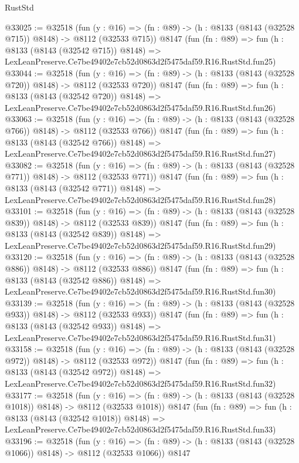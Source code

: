 \begin{lexlean}{RustStd}
\begin{coremodule}
@33025 := @32518
    (fun (y : @16) => (fn : @89) -> (h : @8133 (@8143 (@32528 @715)) @8148) -> @8112 (@32533 @715))
    @8147
    (fun (fn : @89) =>
    fun (h : @8133 (@8143 (@32542 @715)) @8148) =>
    LexLeanPreserve.Ce7be49402e7cb52d0863d2f5475daf59.R16.RustStd.fun25)
@33044 := @32518
    (fun (y : @16) => (fn : @89) -> (h : @8133 (@8143 (@32528 @720)) @8148) -> @8112 (@32533 @720))
    @8147
    (fun (fn : @89) =>
    fun (h : @8133 (@8143 (@32542 @720)) @8148) =>
    LexLeanPreserve.Ce7be49402e7cb52d0863d2f5475daf59.R16.RustStd.fun26)
@33063 := @32518
    (fun (y : @16) => (fn : @89) -> (h : @8133 (@8143 (@32528 @766)) @8148) -> @8112 (@32533 @766))
    @8147
    (fun (fn : @89) =>
    fun (h : @8133 (@8143 (@32542 @766)) @8148) =>
    LexLeanPreserve.Ce7be49402e7cb52d0863d2f5475daf59.R16.RustStd.fun27)
@33082 := @32518
    (fun (y : @16) => (fn : @89) -> (h : @8133 (@8143 (@32528 @771)) @8148) -> @8112 (@32533 @771))
    @8147
    (fun (fn : @89) =>
    fun (h : @8133 (@8143 (@32542 @771)) @8148) =>
    LexLeanPreserve.Ce7be49402e7cb52d0863d2f5475daf59.R16.RustStd.fun28)
@33101 := @32518
    (fun (y : @16) => (fn : @89) -> (h : @8133 (@8143 (@32528 @839)) @8148) -> @8112 (@32533 @839))
    @8147
    (fun (fn : @89) =>
    fun (h : @8133 (@8143 (@32542 @839)) @8148) =>
    LexLeanPreserve.Ce7be49402e7cb52d0863d2f5475daf59.R16.RustStd.fun29)
@33120 := @32518
    (fun (y : @16) => (fn : @89) -> (h : @8133 (@8143 (@32528 @886)) @8148) -> @8112 (@32533 @886))
    @8147
    (fun (fn : @89) =>
    fun (h : @8133 (@8143 (@32542 @886)) @8148) =>
    LexLeanPreserve.Ce7be49402e7cb52d0863d2f5475daf59.R16.RustStd.fun30)
@33139 := @32518
    (fun (y : @16) => (fn : @89) -> (h : @8133 (@8143 (@32528 @933)) @8148) -> @8112 (@32533 @933))
    @8147
    (fun (fn : @89) =>
    fun (h : @8133 (@8143 (@32542 @933)) @8148) =>
    LexLeanPreserve.Ce7be49402e7cb52d0863d2f5475daf59.R16.RustStd.fun31)
@33158 := @32518
    (fun (y : @16) => (fn : @89) -> (h : @8133 (@8143 (@32528 @972)) @8148) -> @8112 (@32533 @972))
    @8147
    (fun (fn : @89) =>
    fun (h : @8133 (@8143 (@32542 @972)) @8148) =>
    LexLeanPreserve.Ce7be49402e7cb52d0863d2f5475daf59.R16.RustStd.fun32)
@33177 := @32518
    (fun (y : @16) =>
    (fn : @89) -> (h : @8133 (@8143 (@32528 @1018)) @8148) -> @8112 (@32533 @1018))
    @8147
    (fun (fn : @89) =>
    fun (h : @8133 (@8143 (@32542 @1018)) @8148) =>
    LexLeanPreserve.Ce7be49402e7cb52d0863d2f5475daf59.R16.RustStd.fun33)
@33196 := @32518
    (fun (y : @16) =>
    (fn : @89) -> (h : @8133 (@8143 (@32528 @1066)) @8148) -> @8112 (@32533 @1066))
    @8147

\end{coremodule}
\end{lexlean}
